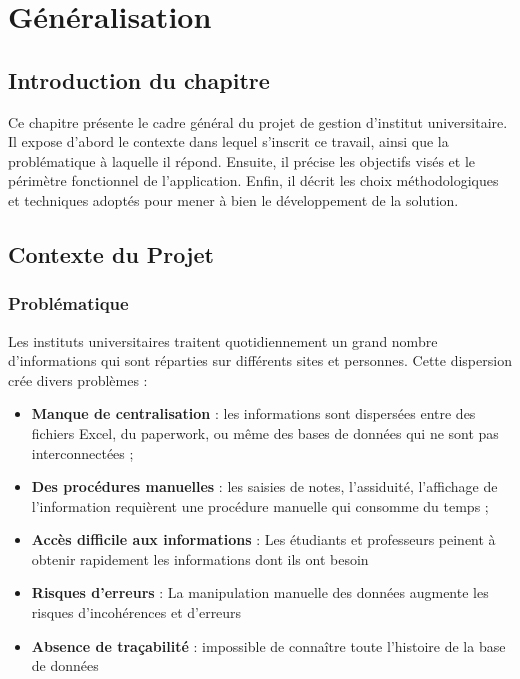 \documentclass[12pt,a4paper]{report}
\begin{document}
\newpage

\chapter{Généralisation}

\section{Introduction du chapitre}

Ce chapitre présente le cadre général du projet de gestion d'institut universitaire. Il expose d'abord le contexte dans lequel s'inscrit ce travail, ainsi que la problématique à laquelle il répond. Ensuite, il précise les objectifs visés et le périmètre fonctionnel de l'application. Enfin, il décrit les choix méthodologiques et techniques adoptés pour mener à bien le développement de la solution.


\section{Contexte du Projet}

\subsection{Problématique}

Les instituts universitaires traitent quotidiennement un grand nombre d'informations qui sont réparties sur différents sites et personnes. Cette dispersion crée divers problèmes :

\begin{itemize}[itemsep=0.5em]
    \item \textbf{Manque de centralisation} : les informations sont dispersées entre des fichiers Excel, du paperwork, ou même des bases de données qui ne sont pas interconnectées ;
    \item \textbf{Des procédures manuelles} : les saisies de notes, l'assiduité, l'affichage de l'information requièrent une procédure manuelle qui consomme du temps ;
    \item \textbf{Accès difficile aux informations} : Les étudiants et professeurs peinent à obtenir rapidement les informations dont ils ont besoin
    \item \textbf{Risques d'erreurs} : La manipulation manuelle des données augmente les risques d'incohérences et d'erreurs
    \item \textbf{Absence de traçabilité} : impossible de connaître toute l'histoire de la base de données
\end{itemize}
\end{document}
